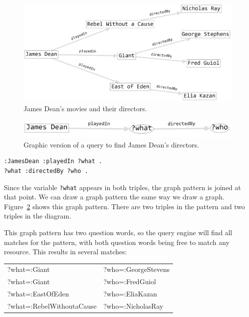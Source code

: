 \begin{figure}
\centering
\includegraphics[width=5in]{SWWOv3/media/ch6/figure6-2.png}
\caption{James Dean's movies and their directors.}
\label{fig:ch6.2}
\end{figure}

\begin{figure}
\centering
\includegraphics[width=5in]{SWWOv3/media/ch6/figure6-3.png}
\caption{Graphic version of a query to find James Dean's directors.}
\label{fig:ch6.3}
\end{figure}



\begin{lstlisting}
:JamesDean :playedIn ?what .
?what :directedBy ?who .
\end{lstlisting}

Since the variable \texttt{?what} appears in both triples, the graph pattern is
joined at that point. We can draw a graph pattern the same way we draw a
graph. Figure~\ref{fig:ch6.3} shows this graph pattern. There are two triples in the
pattern and two triples in the diagram.

This graph pattern has two question words, so the query engine will find
all matches for the pattern, with both question words being free to
match any resource. This results in several matches:

\begin{tabular}{ l l }
?what=:Giant&?who=:GeorgeStevens\\
?what=:Giant&?who=:FredGuiol \\
?what=:EastOfEden&?who=:EliaKazan \\
?what=:RebelWithoutaCause&?who=:NicholasRay \\
\end{tabular}

